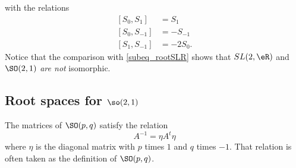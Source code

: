 with the relations
\begin{subequations}
\begin{align}
[S_{0},S_{1}]&=S_{1}\\
[S_{0},S_{-1}]&=-S_{-1}\\
[S_{1},S_{-1}]&=-2S_{0}.
\end{align}
\end{subequations}
Notice that the comparison with \eqref{subeq_rootSLR} shows that $SL(2,\eR)$ and $\SO(2,1)$ \emph{are not} isomorphic.

\subsection{Root spaces for \texorpdfstring{$\so(2,1)$}{so21}}

\begin{proposition}
	The matrices of $\SO(p,q)$ satisfy the relation
	\[ 
		A^{-1}=\eta A^t\eta
	\]
	where $\eta$ is the diagonal matrix with $p$ times $1$ and $q$ times $-1$. That relation is often taken as the definition of $\SO(p,q)$.
\end{proposition}


